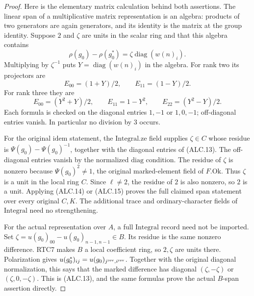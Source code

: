 \begin{proof}
Here is the elementary matrix calculation behind both assertions.
The linear span of a multiplicative matrix representation is
an algebra: products of two generators are again generators,
and its identity is the matrix at the group identity.
Suppose \(2\) and \(\zeta\) are units in the scalar ring
and that this algebra contains
\[
 \rho(g_0)-\rho(g_0^*)
             =\zeta\operatorname{diag}(w(n)_i).
                                                        \tag{ALC.13}
\]
Multiplying by \(\zeta^{-1}\) puts
\(Y=\operatorname{diag}(w(n)_i)\) in the algebra.  For
rank two its projectors are
\[
                  E_{00}=(1+Y)/2,
                  \qquad E_{11}=(1-Y)/2.
                                                        \tag{ALC.14}
\]
For rank three they are
\[
 E_{00}=(Y^2+Y)/2,
 \qquad E_{11}=1-Y^2,
 \qquad E_{22}=(Y^2-Y)/2.
                                                        \tag{ALC.15}
\]
Each formula is checked on the diagonal entries \(1,-1\)
or \(1,0,-1\); off-diagonal entries vanish.  In particular
no division by \(3\) occurs.

For the original \(\mathrm{idem}\) statement, the
\(\mathrm{Integral.ze}\) field supplies \(\zeta\in C\)
whose residue is \(\Psi(g_0)-\Psi(g_0)^{-1}\), together
with the diagonal entries of (ALC.13).  The off-diagonal
entries vanish by the normalized \(\mathrm{diag}\) condition.
The residue of \(\zeta\) is nonzero because
\(\Psi(g_0)^2\ne1\), the original marked-element field
of \(F.\mathrm{Ok}\).  Thus \(\zeta\) is a unit in
the local ring \(C\).  Since \(\ell\ne2\), the residue
of \(2\) is also nonzero, so \(2\) is a unit.  Applying
(ALC.14) or (ALC.15) proves the full claimed span statement
over every original \(C,K\).  The additional trace and
ordinary-character fields of \(\mathrm{Integral}\) need
no strengthening.

For the actual representation over \(A\), a full
\(\mathrm{Integral}\) record need not be imported.  Set
\(\zeta=u(g_0)_{00}-u(g_0)_{n-1,n-1}\in B\).
Its residue is the same nonzero difference.  RTC7 makes
\(B\) a local coefficient ring, so \(2,\zeta\) are units
there.  Polarization gives
\(u(g_0^*)_{ij}=u(g_0)_{j^{\rm rev},i^{\rm rev}}\).
Together with the original diagonal normalization, this says
that the marked difference has diagonal \((\zeta,-\zeta)\)
or \((\zeta,0,-\zeta)\).  This is (ALC.13), and the same
formulas prove the actual \(B\)-span assertion directly.
\end{proof}

